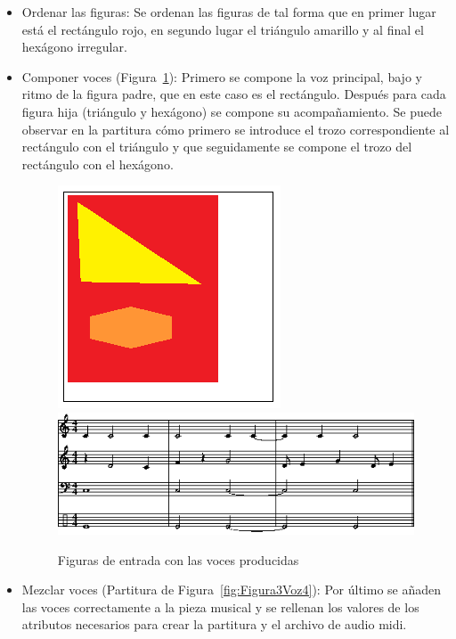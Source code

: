 \begin{itemize}
	\item Ordenar las figuras: Se ordenan las figuras de tal forma que en primer lugar está el rectángulo rojo, en segundo lugar el triángulo amarillo y al final el hexágono irregular.

	\item Componer voces (Figura~\ref{fig:Figura1Mixer}): Primero se compone la voz principal, bajo y ritmo de la figura padre, que en este caso es el rectángulo. Después para cada figura hija (triángulo y hexágono) se compone su acompañamiento. Se puede observar en la partitura cómo primero se introduce el trozo correspondiente al rectángulo con el triángulo y que seguidamente se compone el trozo del rectángulo con el hexágono.

		\begin{figure}[htbp]
		\centering
		\hspace*{0.0in}
		\includegraphics[scale=1]{graphics/simpletest5.png}
		\includegraphics[scale=1]{graphics/simpletest5-partitura.png}
		\caption{Figuras de entrada con las voces producidas}
		\label{fig:Figura1Mixer}
		\end{figure}

	\item Mezclar voces (Partitura de Figura~\ref{fig:Figura3Voz4}): Por último se añaden las voces correctamente a la pieza musical y se rellenan los valores de los atributos necesarios para crear la partitura y el archivo de audio midi.

\end{itemize}
